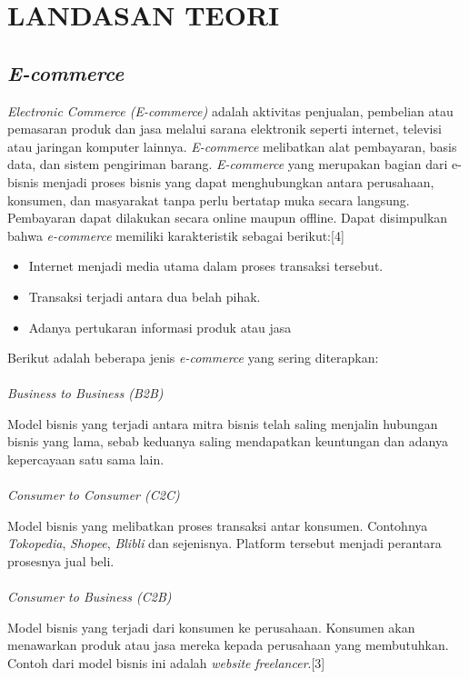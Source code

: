 \chapter{LANDASAN TEORI}
\section{\textit{E-commerce}}
\textit{Electronic Commerce (E-commerce)} adalah aktivitas penjualan, pembelian atau pemasaran produk dan jasa melalui sarana elektronik seperti internet, televisi atau jaringan komputer lainnya. \textit{E-commerce} melibatkan alat pembayaran, basis data, dan sistem pengiriman barang. \textit{E-commerce} yang merupakan bagian dari e-bisnis menjadi proses bisnis yang dapat menghubungkan antara perusahaan, konsumen, dan masyarakat tanpa perlu bertatap muka secara langsung. Pembayaran dapat dilakukan secara online maupun offline. Dapat disimpulkan bahwa \textit{e-commerce} memiliki karakteristik sebagai berikut:[4]
\begin{itemize}
	\item Internet menjadi media utama dalam proses transaksi tersebut.
	\item Transaksi terjadi antara dua belah pihak.
	\item Adanya pertukaran informasi produk atau jasa
\end{itemize}
\par Berikut adalah beberapa jenis \textit{e-commerce} yang sering diterapkan: \\\\
\textit{Business to Business (B2B)}\\
\par Model bisnis yang terjadi antara mitra bisnis telah saling menjalin hubungan bisnis yang lama, sebab keduanya saling mendapatkan keuntungan dan adanya kepercayaan satu sama lain. \\\\
\textit{Consumer to Consumer (C2C)}\\
\par Model bisnis yang melibatkan proses transaksi antar konsumen. Contohnya \textit{Tokopedia}, \textit{Shopee}, \textit{Blibli} dan sejenisnya. Platform tersebut menjadi perantara prosesnya jual beli. \\\\
\textit{Consumer to Business (C2B)}\\
\par Model bisnis yang terjadi dari konsumen ke perusahaan. Konsumen akan menawarkan produk atau jasa mereka kepada perusahaan yang membutuhkan. Contoh dari model bisnis ini adalah \textit{website} \textit{freelancer}.[3]\\

